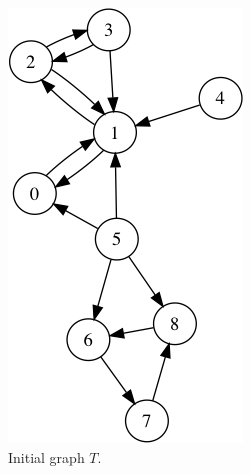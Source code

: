 \begin{figure}
\begin{subfigure}{0.25\textwidth}
\includegraphics[width=\linewidth]{images/mani/0-trust.png}
\caption{Initial graph $T$.} \label{fig:mani0}
\end{subfigure}
\hspace*{2cm} %
\begin{subfigure}{0.25\textwidth}

\end{subfigure}
\end{figure}
